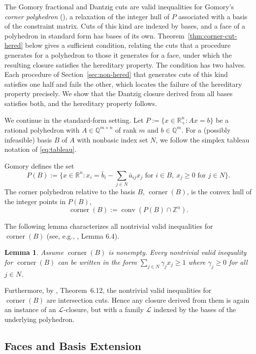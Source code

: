 \documentclass{article}
\newtheorem{lemma}{Lemma}
\newcommand{\Z}{\mathbb{Z}}
\newcommand{\R}{\mathbb{R}}
\newcommand{\Q}{\mathbb{Q}}
\renewcommand{\L}{\mathcal{L}}
\begin{document}
The Gomory fractional and Dantzig cuts are valid inequalities for Gomory's \emph{corner polyhedron} (\cite{gomory1969some}), a relaxation of the integer hull of $P$ associated with a basis of the constraint matrix. Cuts of this kind are indexed by bases, and a face of a polyhedron in standard form has bases of its own. Theorem~\ref{thm:corner-cut-hered} below gives a sufficient condition, relating the cuts that a procedure generates for a polyhedron to those it generates for a face, under which the resulting closure satisfies the hereditary property. The condition has two halves. Each procedure of Section~\ref{sec:non-hered} that generates cuts of this kind satisfies one half and fails the other, which locates the failure of the hereditary property precisely. We show that the Dantzig closure derived from all bases satisfies both, and the hereditary property follows.

We continue in the standard-form setting. Let $P := \{x \in \R_+^n: Ax = b\}$ be a rational polyhedron with $A \in \Q^{m \times n}$ of rank $m$ and $b \in \Q^m$. For a (possibly infeasible) basis $B$ of $A$ with nonbasic index set $N$, we follow the simplex tableau notation of \eqref{eq:tableau}.

Gomory defines the set
$$P(B) := \{x \in \R^n: x_i = \bar{b}_i - \sum_{j \in N} \bar{a}_{ij} x_j \text{ for } i \in B, \ x_j \geq 0 \text{ for } j \in N\}.$$
\noindent The corner polyhedron relative to the basis $B$, $\operatorname{corner}(B)$, is the convex hull of the integer points in $P(B)$,
$$\operatorname{corner}(B) := \operatorname{conv}(P(B) \cap \Z^n).$$

The following lemma characterizes all nontrivial valid inequalities for $\operatorname{corner}(B)$ (see, e.g., \cite{conforti2014integer}, Lemma 6.4).
\begin{lemma} \label{lemma:corner-valid}
    Assume $\operatorname{corner}(B)$ is nonempty. Every nontrivial valid inequality for $\operatorname{corner}(B)$ can be written in the form $\sum_{j \in N} \gamma_j x_j \geq 1$ where $\gamma_j \geq 0$ for all $j \in N$.
\end{lemma}

Furthermore, by \cite{conforti2014integer}, Theorem~6.12, the nontrivial valid inequalities for $\operatorname{corner}(B)$ are intersection cuts. Hence any closure derived from them is again an instance of an $\L$-closure, but with a family $\L$ indexed by the bases of the underlying polyhedron.

\subsection{Faces and Basis Extension} \label{subsec:basis-extension}
\end{document}
